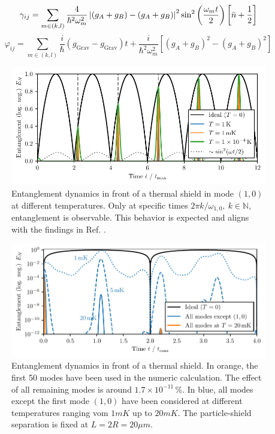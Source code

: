 \begin{equation}
  \gamma_{ij} = \sum_{m\in{(k,l)}} \frac{4}{\hbar^2\omega_m^2} \left\lvert(g_A + g_B) - (g_A + g_B)\right\rvert^2 \sin^2\left(\frac{\omega_m t}{2}\right) \left[\bar{n} + \frac{1}{2}\right]
\end{equation}
\begin{equation}
  \varphi_{ij} = \sum_{m\in{(k,l)}} \frac{i}{\hbar} \left( g_\mathrm{Grav} - g_\mathrm{Grav} \right) t + \frac{i}{\hbar^2\omega_m^2}\left[(g_A + g_B)^2 - (g_A + g_B)^2\right]
\end{equation}

\begin{figure}[!htbp]
  \centering
  \includegraphics[width=\textwidth]{./../figures/vibrations/entanglement-hamiltonian.pdf}
  \caption{Entanglement dynamics in front of a thermal shield in mode $(1,0)$ at different temperatures. Only at specific times $2\pi k / \omega_{1,0},\ k\in\mathbb{N}$, entanglement is observable. This behavior is expected and aligns with the findings in Ref. \cite{Pedernales_2022}.}
\end{figure}

\begin{figure}[!htbp]
  \centering
  \includegraphics[width=\textwidth]{./../figures/vibrations/entanglement-multiple-modes.pdf}
  \caption{Entanglement dynamics in front of a thermal shield. In orange, the first 50 modes have been used in the numeric calculation. The effect of all remaining modes is around $1.7 \times 10^{-11}\,\%$. In blue, all modes except the first mode $(1,0)$ have been considered at different temperatures ranging vom $1\si{mK}$ up to $20\si{mK}$. The particle-shield separation is fixed at $L = 2R = 20\si{\mu m}$.}
\end{figure}

